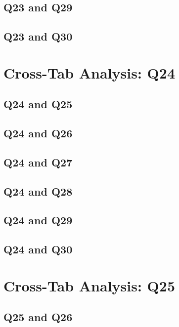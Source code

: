 \documentclass{report}
\begin{document}
\clearpage
\section{Q23 and Q29}


\clearpage
\section{Q23 and Q30}


\chapter{Cross-Tab Analysis: Q24}
\section{Q24 and Q25}


\clearpage
\section{Q24 and Q26}


\clearpage
\section{Q24 and Q27}


\clearpage
\section{Q24 and Q28}


\clearpage
\section{Q24 and Q29}


\clearpage
\section{Q24 and Q30}


\chapter{Cross-Tab Analysis: Q25}
\section{Q25 and Q26}

\end{document}
